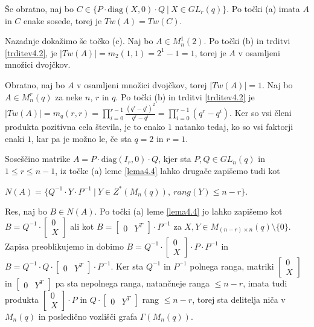 \documentclass[mat1, tisk]{fmfdelo}
\begin{document}
\begin{dokaz}
  Še obratno, naj bo $C \in \{P \cdot \text{diag}(X,0) \cdot Q~|~ X \in GL_r(q)\}$. Po 
  točki (a) imata $A$ in $C$ enake sosede, torej je $Tw(A) = Tw(C)$.

  Nazadnje dokažimo še točko (c). Naj bo $A \in {M}_n^1(2)$. Po točki (b) in 
  trditvi \ref{trditev4.2}, je $|Tw(A)| = m_2(1,1) = 2^1 - 1 = 1$, torej je $A$ v 
  osamljeni množici dvojčkov.

  Obratno, naj bo $A$ v osamljeni množici dvojčkov, torej $|Tw(A)| = 1$. Naj bo 
  $A \in M_n^r(q)$ za neke $n$, $r$ in $q$. Po točki (b) in trditvi \ref{trditev4.2} je 
  $|Tw(A)| = m_q(r,r) = \prod\limits_{i=0}^{r-1} \frac{(q^r - q^i)^2}{q^r - q^i} = \prod\limits_{i=0}^{r-1}(q^r - q^i)$. 
  Ker so vsi členi produkta pozitivna cela števila, je to enako $1$ natanko tedaj, ko 
  so vsi faktorji enaki $1$, kar pa je možno le, če sta $q = 2$ in $r = 1$.
\end{dokaz}
%
\begin{opomba}\label{opomba4.5}
  Soseščino matrike $A = P \cdot \text{diag}(I_r, 0) \cdot Q$, 
  kjer sta $P, Q \in GL_n(q)$ in $1 \leq r \leq n-1$, iz točke (a) 
  leme \ref{lema4.4} lahko drugače zapišemo tudi kot 
  \begin{center}
    $N(A) = \{Q^{-1} \cdot Y \cdot P^{-1}~|~Y \in Z^*(M_n(q)),~rang(Y) \leq n-r\}$. 
  \end{center}
  Res, naj bo 
  $B \in N(A)$. Po točki (a) leme \ref{lema4.4} jo lahko zapišemo kot 
  $B = Q^{-1} \cdot 
  \begin{bmatrix}
    0 \\
    X
  \end{bmatrix}$ ali kot 
  $B = 
  \begin{bmatrix}
    0 & Y^T
  \end{bmatrix} \cdot P^{-1}$ za $X, Y \in M_{(n-r) \times n}(q)\setminus\{0\}$.
  Zapisa preoblikujemo in dobimo
  $B = Q^{-1} \cdot 
  \begin{bmatrix}
    0 \\
    X
  \end{bmatrix} \cdot P \cdot P^{-1}$ in
  $B = Q^{-1} \cdot Q \cdot
  \begin{bmatrix}
    0 & Y^T
  \end{bmatrix} \cdot P^{-1}$. Ker sta $Q^{-1}$ in $P^{-1}$ polnega ranga, matriki 
  $\begin{bmatrix}
    0 \\
    X
  \end{bmatrix}$ in 
  $\begin{bmatrix}
    0 & Y^T
  \end{bmatrix}$ pa sta nepolnega ranga, 
  natančneje ranga $\leq n-r$, imata tudi produkta 
  $\begin{bmatrix}
    0 \\
    X
  \end{bmatrix} \cdot P$ in 
  $Q \cdot
  \begin{bmatrix}
    0 & Y^T
  \end{bmatrix}$ rang $\leq n-r$, torej sta delitelja niča v $M_n(q)$ 
  in posledično vozlišči grafa $\Gamma(M_n(q))$.
\end{opomba}
\end{document}

